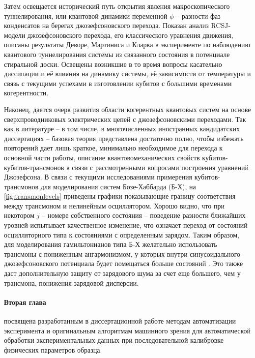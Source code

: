 \documentclass[14pt, a4paper]{extarticle}
\begin{document}
Затем освещается исторический путь открытия явления макроскопического туннелирования, или квантовой динамики переменной $\phi$ -- разности фаз конденсатов на берегах джозефсоновского перехода. Показан анализ RCSJ-модели джозефсоновского перехода, его классического уравнения движения, описаны результаты Деворе, Мартиниса и Кларка в эксперименте по наблюдению квантового туннелирования системы из связанного состояния в потенциале стиральной доски. Освещены возникшие в то время вопросы касательно диссипации и её влияния на динамику системы, её зависимости от температуры и связь с текущими успехами в изготовлении кубитов с большими временами когерентности.

Наконец, дается очерк развития области когерентных квантовых систем на основе сверхпроводниковых электрических цепей с джозефсоновскими переходами. Так как в литературе -- в том числе, в многочисленных иностранных кандидатских диссертациях -- базовая теория представлена достаточно полно, чтобы избежать повторений дает лишь краткое, минимально необходимое для перехода к основной части работы, описание квантовомеханических свойств кубитов-кубитов\hyp трансмонов в связи с рассмотренными вопросами построения уравнений Джозефсона. В связи с текущими исследованиями примерения кубитов\hyp трансмонов для моделирования систем Бозе-Хаббарда (Б-Х), на \autoref{fig:transmonlevels} приведены графики показывающие границу соответствия между трансмоном и нелинейным осциллятором. Хорошо видно, что при некотором $j$ -- номере собственного состояния -- поведение разности ближайших уровней испытывает качественное изменение, что означает переход от состояний осцилляторного типа к состояниями с определенным зарядом. Таким образом, для моделирования гамильтонианов типа Б-Х желательно использовать трансмоны с пониженным ангармонизмом, у которых внутри синусоидального джозефсоновского потенциала будет помещаться больше состояний \cite{winkel2020implementation}. Это также даст дополнительную защиту от зарядового шума за счет еще большего, чем у трансмона, понижения зарядовой дисперсии. 

\paragraph{Вторая глава} посвящена разработанным в диссертационной работе методам автоматизации эксперимента и оригинальным алгоритмам машинного зрения для автоматической обработки экспериментальных данных при последовательной калибровке физических параметров образца. 
\end{document}
